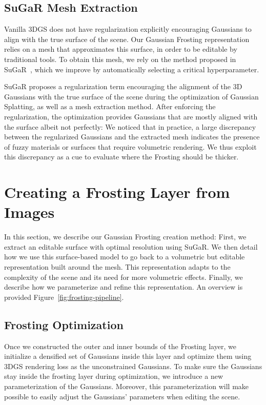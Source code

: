 \subsection{SuGaR Mesh Extraction} 

Vanilla 3DGS does not have regularization explicitly encouraging Gaussians to align with the true surface of the scene. Our Gaussian Frosting representation relies on a mesh that approximates this surface, in order to be editable by traditional tools. To obtain this mesh, we rely on the method proposed in SuGaR~\cite{guedon2023sugar}, which we improve by automatically selecting a critical hyperparameter.

SuGaR proposes a regularization term encouraging the alignment of the 3D Gaussians with the true surface of the scene during the optimization of Gaussian Splatting, as well as a mesh extraction method. After enforcing the regularization, the optimization provides Gaussians that are mostly aligned with the surface albeit not perfectly: We noticed that in practice, a large discrepancy between the regularized Gaussians and the extracted mesh indicates the presence of fuzzy materials or surfaces that require volumetric rendering. We thus exploit this discrepancy as a cue to evaluate where the Frosting should be thicker.



\section{Creating a Frosting Layer from Images}

In this section, we describe our Gaussian Frosting creation method: 
First, we extract an editable surface with optimal resolution using SuGaR. We then detail how we use this surface-based model to go back to a volumetric but editable representation built around the mesh. This representation adapts to the complexity of the scene and its need for more volumetric effects. Finally, we describe how we parameterize and refine this representation. An overview is provided Figure~\ref{fig:frosting-pipeline}.





\subsection{Frosting Optimization}

Once we constructed the outer and inner bounds of the Frosting layer, we initialize a densified set of Gaussians inside this layer and optimize them using 3DGS rendering loss as the unconstrained Gaussians. To make sure the Gaussians stay inside the frosting layer during optimization, we introduce a new parameterization of the Gaussians. Moreover, this parameterization will make possible to 
easily adjust the Gaussians' parameters when editing the scene.


